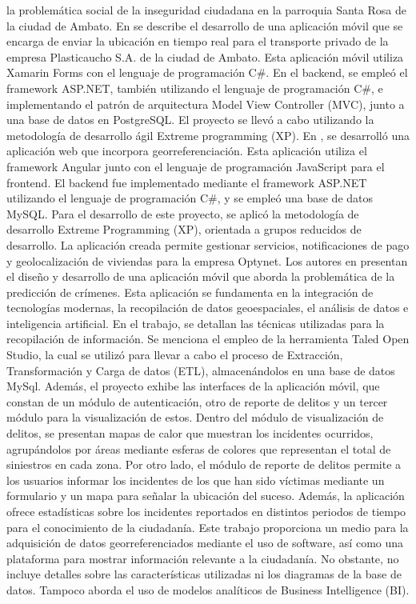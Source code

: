 la problemática social de la inseguridad ciudadana en la parroquia Santa Rosa de la ciudad de Ambato.
\bigbreak
En \cite{lesanoperezAplicativoMovilGeoubicacion2022} se describe el desarrollo de una aplicación móvil que se encarga de enviar
la ubicación en tiempo real para el transporte privado de la empresa Plasticaucho S.A. de la ciudad de Ambato. Esta aplicación móvil
utiliza Xamarin Forms con el lenguaje de programación C\#. En el backend, se empleó el framework ASP.NET, también utilizando el lenguaje
de programación C\#, e implementando el patrón de arquitectura Model View Controller (MVC), junto a una base de datos en PostgreSQL. El proyecto se llevó a
cabo utilizando la metodología de desarrollo ágil Extreme programming (XP).
\bigbreak
En \cite{chicaizavillegasAplicacionWebPara2023}, se desarrolló una aplicación web que incorpora georreferenciación.
Esta aplicación utiliza el framework Angular junto con el lenguaje de programación JavaScript para el frontend. El backend fue
implementado mediante el framework ASP.NET utilizando el lenguaje de programación C\#, y se empleó una base de datos MySQL. Para
el desarrollo de este proyecto, se aplicó la metodología de desarrollo Extreme Programming (XP), orientada a grupos reducidos de
desarrollo. La aplicación creada permite gestionar servicios, notificaciones de pago y geolocalización de viviendas para la empresa
Optynet.
\bigbreak
Los autores en \cite{cantilloAplicativoMovilPara} presentan el diseño y desarrollo de una aplicación móvil que aborda la
problemática de la predicción de crímenes. Esta aplicación se fundamenta en la integración de tecnologías modernas, la recopilación
de datos geoespaciales, el análisis de datos e inteligencia artificial. En el trabajo, se detallan las técnicas utilizadas para la
recopilación de información. Se menciona el empleo de la herramienta Taled Open Studio, la cual se utilizó para llevar a cabo el
proceso de Extracción, Transformación y Carga de datos (ETL), almacenándolos en una base de datos MySql. Además, el proyecto exhibe
las interfaces de la aplicación móvil, que constan de un módulo de autenticación, otro de reporte de delitos y un tercer módulo para
la visualización de estos. Dentro del módulo de visualización de delitos, se presentan mapas de calor que muestran los incidentes
ocurridos, agrupándolos por áreas mediante esferas de colores que representan el total de siniestros en cada zona. Por otro lado,
el módulo de reporte de delitos permite a los usuarios informar los incidentes de los que han sido víctimas mediante un formulario
y un mapa para señalar la ubicación del suceso. Además, la aplicación ofrece estadísticas sobre los incidentes reportados en distintos
periodos de tiempo para el conocimiento de la ciudadanía. Este trabajo proporciona un medio para la adquisición de datos georreferenciados
mediante el uso de software, así como una plataforma para mostrar información relevante a la ciudadanía. No obstante, no incluye detalles
sobre las características utilizadas ni los diagramas de la base de datos. Tampoco aborda el uso de modelos analíticos de Business
Intelligence (BI).
